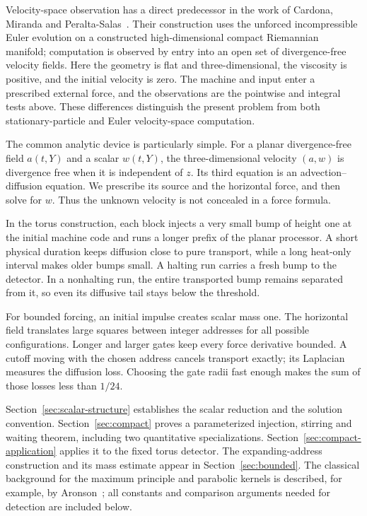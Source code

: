 \documentclass[11pt]{article}
\theoremstyle{definition}
\theoremstyle{remark}
\begin{document}
Velocity-space observation has a direct predecessor in the work of
Cardona, Miranda and Peralta-Salas~\cite{CardonaMirandaPeraltaSalas2022}.
Their construction uses the unforced incompressible Euler evolution on
a constructed high-dimensional compact Riemannian manifold; computation
is observed by entry into an open set of divergence-free velocity
fields. Here the geometry is flat and three-dimensional, the viscosity
is positive, and the initial velocity is zero. The machine and input
enter a prescribed external force, and the observations are the
pointwise and integral tests above. These differences distinguish the
present problem from both stationary-particle and Euler velocity-space
computation.

The common analytic device is particularly simple. For a planar
divergence-free field $a(t,Y)$ and a scalar $w(t,Y)$, the three-dimensional
velocity $(a,w)$ is divergence free when it is independent of $z$.
Its third equation is an advection--diffusion equation. We prescribe its
source and the horizontal force, and then solve for $w$. Thus the unknown
velocity is not concealed in a force formula.

In the torus construction, each block injects a very small bump of height
one at the initial machine code and runs a longer prefix of the planar
processor. A short physical duration keeps diffusion close to pure
transport, while a long heat-only interval makes older bumps small.
A halting run carries a fresh bump to the detector. In a nonhalting run,
the entire transported bump remains separated from it, so even its
diffusive tail stays below the threshold.

For bounded forcing, an initial impulse creates scalar mass one.
The horizontal field translates large squares between integer addresses
for all possible configurations. Longer and larger gates keep every
force derivative bounded. A cutoff moving with the chosen address
cancels transport exactly; its Laplacian measures the diffusion loss.
Choosing the gate radii fast enough makes the sum of those losses less
than $1/24$.

Section~\ref{sec:scalar-structure} establishes the scalar reduction and
the solution convention. Section~\ref{sec:compact} proves a parameterized
injection, stirring and waiting theorem, including two quantitative
specializations. Section~\ref{sec:compact-application} applies it to the
fixed torus detector. The expanding-address construction and its mass
estimate appear in Section~\ref{sec:bounded}. The classical background
for the maximum principle and parabolic kernels is described, for
example, by Aronson~\cite{Aronson1968}; all constants and comparison
arguments needed for detection are included below.
\end{document}
